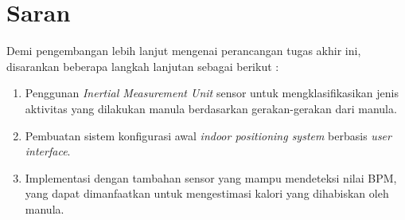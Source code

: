 \section{Saran}
Demi pengembangan lebih lanjut mengenai perancangan tugas akhir ini, disarankan beberapa langkah lanjutan sebagai berikut :
\begin{enumerate}
	\item Penggunan \textit{Inertial Measurement Unit} sensor untuk mengklasifikasikan jenis aktivitas yang dilakukan manula berdasarkan gerakan-gerakan dari manula.
	
	\item Pembuatan sistem konfigurasi awal \textit{indoor positioning system} berbasis \textit{user interface}.
	
	\item Implementasi dengan tambahan sensor yang mampu mendeteksi nilai BPM, yang dapat dimanfaatkan untuk mengestimasi kalori yang dihabiskan oleh manula.
\end{enumerate}


\vspace{1ex}